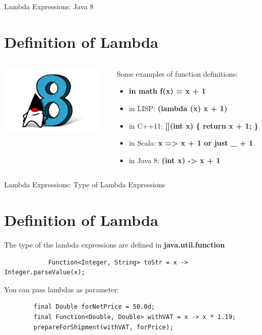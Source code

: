 \documentclass{beamer}
\begin{document}
	
	\begin{frame}{Lambda Expressions: Java 8}
	\section{Definition of Lambda}
	\begin{columns}
    	\begin{column}{0.3\textwidth}
			\centering
			\includegraphics[width=5cm]{duke8}	
    	\end{column}
    	\begin{column}{0.7\textwidth}
			Some examples of function definitions:
			\begin{itemize}
				\item \textbf{in math f(x) = x + 1} 
				\item in LISP: \textbf{(lambda (x) x + 1)}
				\item in C++11: \textbf{[](int x) \{ return x + 1; \} }
				\item in Scala: \textbf{x => x + 1 or just \_ + 1}
				\item in Java 8: \textbf{(int x) -> x + 1}
				\end{itemize}
  		\end{column}
	\end{columns}
	\end{frame}	

	\begin{frame}[fragile]{Lambda Expressions: Type of Lambda Expressions}
		\section{Definition of Lambda}
		The type of the lambda expressions are defined in \textbf{java.util.function}
		\begin{lstlisting}
			Function<Integer, String> toStr = x -> Integer.parseValue(x);

		\end{lstlisting}
		
		You can pass lambdas as parameter:
		
		\begin{lstlisting}
		final Double forNetPrice = 50.0d;
		final Function<Double, Double> withVAT = x -> x * 1.19;
		prepareForShipment(withVAT, forPrice);
		\end{lstlisting}
	\end{frame}	
	
\end{document}
